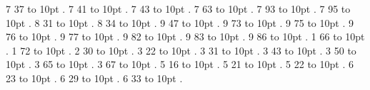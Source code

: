 \smallskip
{} 7 37 \leaders\hbox to 10pt {\hss.\hss}  \hfill {}
\smallskip
{} 7 41 \leaders\hbox to 10pt {\hss.\hss}  \hfill {}
\smallskip
{} 7 43 \leaders\hbox to 10pt {\hss.\hss}  \hfill {}
\smallskip
{} 7 63 \leaders\hbox to 10pt {\hss.\hss}  \hfill {}
\smallskip
{} 7 93 \leaders\hbox to 10pt {\hss.\hss}  \hfill {}
\smallskip
{} 7 95 \leaders\hbox to 10pt {\hss.\hss}  \hfill {}
\smallskip
{} 8 31 \leaders\hbox to 10pt {\hss.\hss}  \hfill {}
\smallskip
{} 8 34 \leaders\hbox to 10pt {\hss.\hss}  \hfill {}
\smallskip
{} 9 47 \leaders\hbox to 10pt {\hss.\hss}  \hfill {}
\smallskip
{} 9 73 \leaders\hbox to 10pt {\hss.\hss}  \hfill {}
\smallskip
{} 9 75 \leaders\hbox to 10pt {\hss.\hss}  \hfill {}
\smallskip
{} 9 76 \leaders\hbox to 10pt {\hss.\hss}  \hfill {}
\smallskip
{} 9 77 \leaders\hbox to 10pt {\hss.\hss}  \hfill {}
\smallskip
{} 9 82 \leaders\hbox to 10pt {\hss.\hss}  \hfill {}
\smallskip
{} 9 83 \leaders\hbox to 10pt {\hss.\hss}  \hfill {}
\smallskip
{} 9 86 \leaders\hbox to 10pt {\hss.\hss}  \hfill {}
\smallskip
{} 1 66 \leaders\hbox to 10pt {\hss.\hss}  \hfill {}
\smallskip
{} 1 72 \leaders\hbox to 10pt {\hss.\hss}  \hfill {}
\smallskip
{} 2 30 \leaders\hbox to 10pt {\hss.\hss}  \hfill {}
\smallskip
{} 3 22 \leaders\hbox to 10pt {\hss.\hss}  \hfill {}
\smallskip
{} 3 31 \leaders\hbox to 10pt {\hss.\hss}  \hfill {}
\smallskip
{} 3 43 \leaders\hbox to 10pt {\hss.\hss}  \hfill {}
\smallskip
{} 3 50 \leaders\hbox to 10pt {\hss.\hss}  \hfill {}
\smallskip
{} 3 65 \leaders\hbox to 10pt {\hss.\hss}  \hfill {}
\smallskip
{} 3 67 \leaders\hbox to 10pt {\hss.\hss}  \hfill {}
\smallskip
{} 5 16 \leaders\hbox to 10pt {\hss.\hss}  \hfill {}
\smallskip
{} 5 21 \leaders\hbox to 10pt {\hss.\hss}  \hfill {}
\smallskip
{} 5 22 \leaders\hbox to 10pt {\hss.\hss}  \hfill {}
\smallskip
{} 6 23 \leaders\hbox to 10pt {\hss.\hss}  \hfill {}
\smallskip
{} 6 29 \leaders\hbox to 10pt {\hss.\hss}  \hfill {}
\smallskip
{} 6 33 \leaders\hbox to 10pt {\hss.\hss}  \hfill {}
